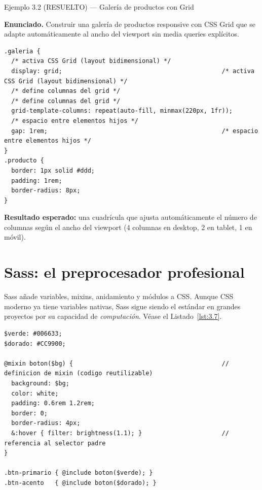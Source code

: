 \documentclass[11pt,a4paper,openany]{book}
\begin{document}
\begin{cajaejemplo}{Ejemplo 3.2 (RESUELTO) --- Galería de productos con Grid}


\textbf{Enunciado.} Construir una galería de productos responsive con CSS Grid que se adapte automáticamente al ancho del viewport sin media queries explícitos.

\begin{lstlisting}[style=css,caption={galeria.css (fragmento)},label=lst:3.6]
.galeria {
  /* activa CSS Grid (layout bidimensional) */
  display: grid;                                            /* activa CSS Grid (layout bidimensional) */
  /* define columnas del grid */
  /* define columnas del grid */
  grid-template-columns: repeat(auto-fill, minmax(220px, 1fr));
  /* espacio entre elementos hijos */
  gap: 1rem;                                                /* espacio entre elementos hijos */
}
.producto {
  border: 1px solid #ddd;
  padding: 1rem;
  border-radius: 8px;
}
\end{lstlisting}

\textbf{Resultado esperado:} una cuadrícula que ajusta automáticamente
el número de columnas según el ancho del viewport (4 columnas en
desktop, 2 en tablet, 1 en móvil).

\end{cajaejemplo}

\section{Sass: el preprocesador profesional}

Sass añade variables, mixins, anidamiento y módulos a CSS. Aunque
CSS moderno ya tiene variables nativas, Sass sigue siendo el estándar
en grandes proyectos por su capacidad de \emph{computación}. V\'ease el Listado~\ref{lst:3.7}.

\begin{lstlisting}[style=sass,caption={ejemplo.scss},numbers=none,label=lst:3.7]
$verde: #006633;
$dorado: #CC9900;

@mixin boton($bg) {                                         // definicion de mixin (codigo reutilizable)
  background: $bg;
  color: white;
  padding: 0.6rem 1.2rem;
  border: 0;
  border-radius: 4px;
  &:hover { filter: brightness(1.1); }                      // referencia al selector padre
}

.btn-primario { @include boton($verde); }
.btn-acento   { @include boton($dorado); }
\end{lstlisting}
\end{document}
